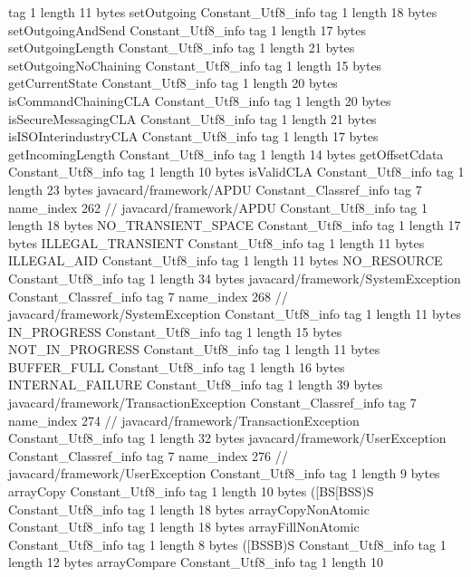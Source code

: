 {{{			tag	1
			length	11
			bytes	setOutgoing
		}
		Constant_Utf8_info {
			tag	1
			length	18
			bytes	setOutgoingAndSend
		}
		Constant_Utf8_info {
			tag	1
			length	17
			bytes	setOutgoingLength
		}
		Constant_Utf8_info {
			tag	1
			length	21
			bytes	setOutgoingNoChaining
		}
		Constant_Utf8_info {
			tag	1
			length	15
			bytes	getCurrentState
		}
		Constant_Utf8_info {
			tag	1
			length	20
			bytes	isCommandChainingCLA
		}
		Constant_Utf8_info {
			tag	1
			length	20
			bytes	isSecureMessagingCLA
		}
		Constant_Utf8_info {
			tag	1
			length	21
			bytes	isISOInterindustryCLA
		}
		Constant_Utf8_info {
			tag	1
			length	17
			bytes	getIncomingLength
		}
		Constant_Utf8_info {
			tag	1
			length	14
			bytes	getOffsetCdata
		}
		Constant_Utf8_info {
			tag	1
			length	10
			bytes	isValidCLA
		}
		Constant_Utf8_info {
			tag	1
			length	23
			bytes	javacard/framework/APDU
		}
		Constant_Classref_info {
			tag	7
			name_index	262		// javacard/framework/APDU
		}
		Constant_Utf8_info {
			tag	1
			length	18
			bytes	NO_TRANSIENT_SPACE
		}
		Constant_Utf8_info {
			tag	1
			length	17
			bytes	ILLEGAL_TRANSIENT
		}
		Constant_Utf8_info {
			tag	1
			length	11
			bytes	ILLEGAL_AID
		}
		Constant_Utf8_info {
			tag	1
			length	11
			bytes	NO_RESOURCE
		}
		Constant_Utf8_info {
			tag	1
			length	34
			bytes	javacard/framework/SystemException
		}
		Constant_Classref_info {
			tag	7
			name_index	268		// javacard/framework/SystemException
		}
		Constant_Utf8_info {
			tag	1
			length	11
			bytes	IN_PROGRESS
		}
		Constant_Utf8_info {
			tag	1
			length	15
			bytes	NOT_IN_PROGRESS
		}
		Constant_Utf8_info {
			tag	1
			length	11
			bytes	BUFFER_FULL
		}
		Constant_Utf8_info {
			tag	1
			length	16
			bytes	INTERNAL_FAILURE
		}
		Constant_Utf8_info {
			tag	1
			length	39
			bytes	javacard/framework/TransactionException
		}
		Constant_Classref_info {
			tag	7
			name_index	274		// javacard/framework/TransactionException
		}
		Constant_Utf8_info {
			tag	1
			length	32
			bytes	javacard/framework/UserException
		}
		Constant_Classref_info {
			tag	7
			name_index	276		// javacard/framework/UserException
		}
		Constant_Utf8_info {
			tag	1
			length	9
			bytes	arrayCopy
		}
		Constant_Utf8_info {
			tag	1
			length	10
			bytes	([BS[BSS)S
		}
		Constant_Utf8_info {
			tag	1
			length	18
			bytes	arrayCopyNonAtomic
		}
		Constant_Utf8_info {
			tag	1
			length	18
			bytes	arrayFillNonAtomic
		}
		Constant_Utf8_info {
			tag	1
			length	8
			bytes	([BSSB)S
		}
		Constant_Utf8_info {
			tag	1
			length	12
			bytes	arrayCompare
		}
		Constant_Utf8_info {
			tag	1
			length	10
}}}
